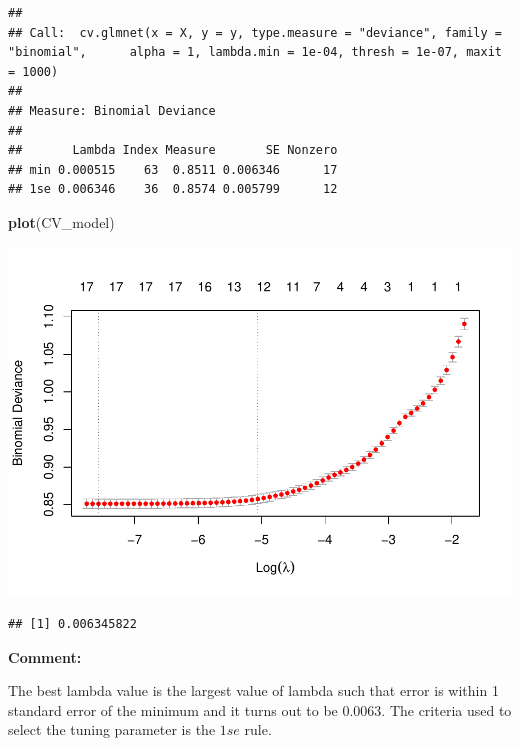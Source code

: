 \documentclass[
  11pt,
]{article}
\newenvironment{Shaded}{\begin{snugshade}}{\end{snugshade}}
\newcommand{\FloatTok}[1]{\textcolor[rgb]{0.00,0.00,0.81}{#1}}
\newcommand{\FunctionTok}[1]{\textcolor[rgb]{0.13,0.29,0.53}{\textbf{#1}}}
\newcommand{\NormalTok}[1]{#1}
\newcommand{\OtherTok}[1]{\textcolor[rgb]{0.56,0.35,0.01}{#1}}
\newcommand{\SpecialCharTok}[1]{\textcolor[rgb]{0.81,0.36,0.00}{\textbf{#1}}}
\begin{document}
\begin{verbatim}
## 
## Call:  cv.glmnet(x = X, y = y, type.measure = "deviance", family = "binomial",      alpha = 1, lambda.min = 1e-04, thresh = 1e-07, maxit = 1000) 
## 
## Measure: Binomial Deviance 
## 
##       Lambda Index Measure       SE Nonzero
## min 0.000515    63  0.8511 0.006346      17
## 1se 0.006346    36  0.8574 0.005799      12
\end{verbatim}

\begin{Shaded}
\begin{Highlighting}[]
\FunctionTok{plot}\NormalTok{(CV\_model)}
\end{Highlighting}
\end{Shaded}

\includegraphics[width=0.9\linewidth]{OWUSU_project_files/figure-latex/unnamed-chunk-19-1}

\begin{Shaded}
\end{Shaded}

\begin{verbatim}
## [1] 0.006345822
\end{verbatim}

\textbf{Comment:}

The best lambda value is the largest value of lambda such that error is
within 1 standard error of the minimum and it turns out to be 0.0063.
The criteria used to select the tuning parameter is the \(1se\) rule.
\end{document}
